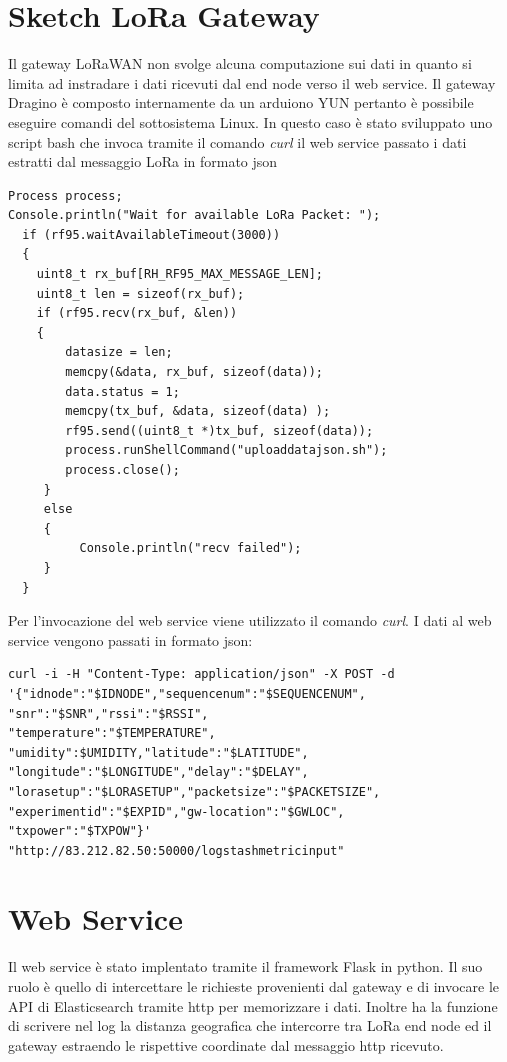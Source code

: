 \documentclass[12pt,a4paper,openright,twoside]{report}
\begin{document}
\section{Sketch LoRa Gateway}
Il gateway LoRaWAN non svolge alcuna computazione sui dati in quanto si limita ad instradare i dati ricevuti dal end node verso il web service. Il gateway Dragino \`e composto internamente da un arduiono YUN pertanto \`e possibile eseguire comandi del sottosistema Linux. In questo caso \`e stato sviluppato uno script bash che invoca tramite il comando \textit{curl} il web service passato i dati estratti dal messaggio LoRa in formato json

\begin{lstlisting}
Process process;
Console.println("Wait for available LoRa Packet: ");
  if (rf95.waitAvailableTimeout(3000))
  {
    uint8_t rx_buf[RH_RF95_MAX_MESSAGE_LEN];
    uint8_t len = sizeof(rx_buf);  
    if (rf95.recv(rx_buf, &len))
    {
        datasize = len;
        memcpy(&data, rx_buf, sizeof(data));
        data.status = 1;     
        memcpy(tx_buf, &data, sizeof(data) );
        rf95.send((uint8_t *)tx_buf, sizeof(data));           
        process.runShellCommand("uploaddatajson.sh");
        process.close();                       
     }
     else
     {
          Console.println("recv failed");
     }
  } 
\end{lstlisting}

Per l'invocazione del web service viene utilizzato il comando \textit{curl}. I dati al web service vengono passati in formato json:
\begin{lstlisting}
curl -i -H "Content-Type: application/json" -X POST -d 
'{"idnode":"$IDNODE","sequencenum":"$SEQUENCENUM",
"snr":"$SNR","rssi":"$RSSI",
"temperature":"$TEMPERATURE",
"umidity":$UMIDITY,"latitude":"$LATITUDE",
"longitude":"$LONGITUDE","delay":"$DELAY",
"lorasetup":"$LORASETUP","packetsize":"$PACKETSIZE",
"experimentid":"$EXPID","gw-location":"$GWLOC",
"txpower":"$TXPOW"}' 
"http://83.212.82.50:50000/logstashmetricinput"
\end{lstlisting}

\section{Web Service}
Il web service \`e stato implentato tramite il framework Flask in python. Il suo ruolo \`e quello di intercettare le richieste provenienti dal gateway e di invocare le API di Elasticsearch tramite http per memorizzare i dati. Inoltre ha la funzione di scrivere nel log la distanza geografica che intercorre tra LoRa end node ed il gateway estraendo le rispettive coordinate dal messaggio http ricevuto.  
\end{document}
